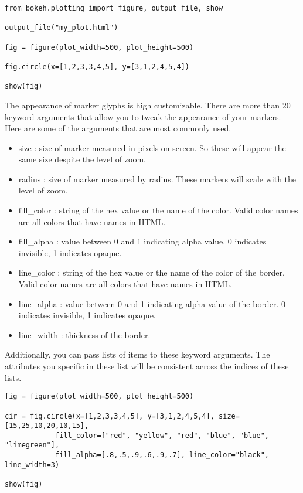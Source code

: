 \begin{lstlisting}
from bokeh.plotting import figure, output_file, show

output_file("my_plot.html")

fig = figure(plot_width=500, plot_height=500)

fig.circle(x=[1,2,3,3,4,5], y=[3,1,2,4,5,4])

show(fig)
\end{lstlisting}

The appearance of marker glyphs is high customizable. There are more than 20 keyword
arguments that allow you to tweak the appearance of your markers. Here are some
of the arguments that are most commonly used.

\begin{itemize}
    \item size : size of marker measured in pixels on screen. So these will
        appear the same size despite the level of zoom.
    \item radius : size of marker measured by radius. These markers will scale
        with the level of zoom.
    \item fill\_color : string of the hex value or the name of the
        color. Valid color names are all colors that have names in HTML.
    \item fill\_alpha : value between 0 and 1 indicating alpha value. 0 indicates
        invisible, 1 indicates opaque.
    \item line\_color : string of the hex value or the name of the
        color of the border. Valid color names are all colors that have
        names in HTML.
    \item line\_alpha : value between 0 and 1 indicating alpha value of the
        border. 0 indicates invisible, 1 indicates opaque.
    \item line\_width : thickness of the border.
\end{itemize}

Additionally, you can pass lists of items to these keyword arguments. The
attributes you specific in these list will be consistent across the indices of
these lists.

\begin{lstlisting}
fig = figure(plot_width=500, plot_height=500)

cir = fig.circle(x=[1,2,3,3,4,5], y=[3,1,2,4,5,4], size=[15,25,10,20,10,15],
            fill_color=["red", "yellow", "red", "blue", "blue", "limegreen"],
            fill_alpha=[.8,.5,.9,.6,.9,.7], line_color="black", line_width=3)

show(fig)
\end{lstlisting}

